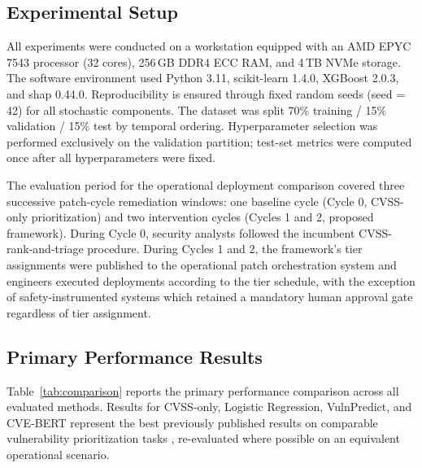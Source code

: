 \documentclass[review,12pt]{elsarticle}
\begin{document}
\subsection{Experimental Setup}
\label{sec:evaluation:setup}

All experiments were conducted on a workstation equipped with an AMD EPYC 7543 processor (32 cores), 256\,GB DDR4 ECC RAM, and 4\,TB NVMe storage. The software environment used Python 3.11, scikit-learn 1.4.0, XGBoost 2.0.3, and shap 0.44.0. Reproducibility is ensured through fixed random seeds (seed = 42) for all stochastic components. The dataset was split 70\% training / 15\% validation / 15\% test by temporal ordering. Hyperparameter selection was performed exclusively on the validation partition; test-set metrics were computed once after all hyperparameters were fixed.

The evaluation period for the operational deployment comparison covered three successive patch-cycle remediation windows: one baseline cycle (Cycle 0, CVSS-only prioritization) and two intervention cycles (Cycles 1 and 2, proposed framework). During Cycle 0, security analysts followed the incumbent CVSS-rank-and-triage procedure. During Cycles 1 and 2, the framework's tier assignments were published to the operational patch orchestration system and engineers executed deployments according to the tier schedule, with the exception of safety-instrumented systems which retained a mandatory human approval gate regardless of tier assignment.

\subsection{Primary Performance Results}
\label{sec:evaluation:primary}

Table~\ref{tab:comparison} reports the primary performance comparison across all evaluated methods. Results for CVSS-only, Logistic Regression, VulnPredict, and CVE-BERT represent the best previously published results on comparable vulnerability prioritization tasks \citep{vulnpredict,cvebert,krause2022}, re-evaluated where possible on an equivalent operational scenario.
\end{document}
